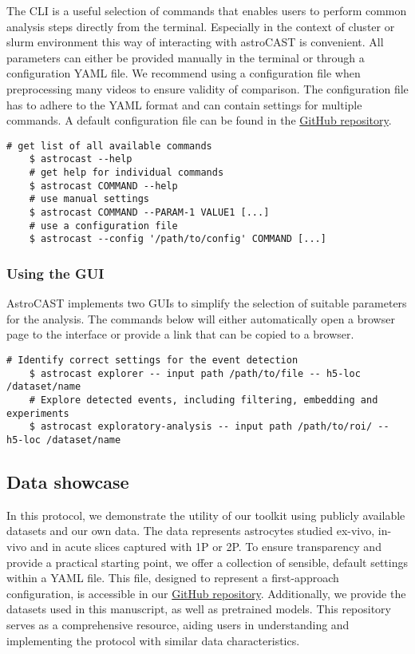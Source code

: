 The \ac{CLI} is a useful selection of commands that enables users to perform common analysis steps directly from the terminal. Especially in the context of cluster or slurm environment this way of interacting with astroCAST is convenient. All parameters can either be provided manually in the terminal or through a configuration YAML file. We recommend using a configuration file when preprocessing many videos to ensure validity of comparison. The configuration file has to adhere to the YAML format and can contain settings for multiple commands. A default configuration file can be found in the \href{https://github.com/janreising/astroCAST/blob/3ad41d03068732419df7fdde9b2a0f449898d4e2/config.yaml}{GitHub repository}.


\begin{lstlisting}[style=bashStyle]
    # get list of all available commands
    $ astrocast --help
    # get help for individual commands
    $ astrocast COMMAND --help
    # use manual settings
    $ astrocast COMMAND --PARAM-1 VALUE1 [...]
    # use a configuration file
    $ astrocast --config '/path/to/config' COMMAND [...]
\end{lstlisting}

\subsubsection{Using the \ac{GUI}}

AstroCAST implements two \ac{GUI}s to simplify the selection of suitable parameters for the analysis. The commands below will either automatically open a browser page to the interface or provide a link that can be copied to a browser.

\begin{lstlisting}[style=bashStyle]
    # Identify correct settings for the event detection
    $ astrocast explorer -- input path /path/to/file -- h5-loc /dataset/name
    # Explore detected events, including filtering, embedding and experiments
    $ astrocast exploratory-analysis -- input path /path/to/roi/ -- h5-loc /dataset/name
\end{lstlisting}

\subsection{Data showcase}

In this protocol, we demonstrate the utility of our toolkit using publicly available datasets and our own data. The data represents astrocytes studied ex-vivo, in-vivo and in acute slices captured with \ac{1P} or \ac{2P}. To ensure transparency and provide a practical starting point, we offer a collection of sensible, default settings within a YAML file. This file, designed to represent a first-approach configuration, is accessible in our \href{https://github.com/janreising/astroCAST}{GitHub repository}. Additionally, we provide the datasets used in this manuscript, as well as pretrained models. This repository serves as a comprehensive resource, aiding users in understanding and implementing the protocol with similar data characteristics.

